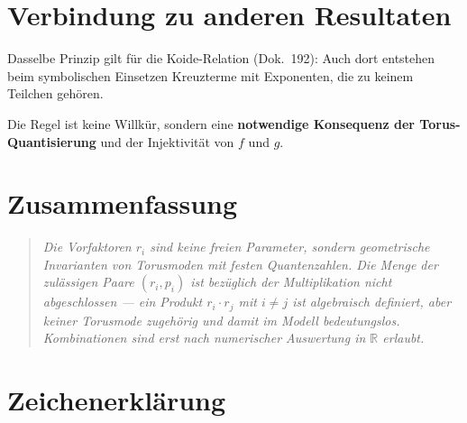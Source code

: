 \section{Verbindung zu anderen Resultaten}

Dasselbe Prinzip gilt für die Koide-Relation (Dok.~192):
Auch dort entstehen beim symbolischen Einsetzen Kreuzterme mit
Exponenten, die zu keinem Teilchen gehören.

Die Regel ist keine Willkür, sondern eine \textbf{notwendige
Konsequenz der Torus-Quantisierung} und der Injektivität von
$f$ und $g$.

\section*{Zusammenfassung}

\begin{quote}
\emph{Die Vorfaktoren $r_i$ sind keine freien Parameter, sondern
geometrische Invarianten von Torusmoden mit festen Quantenzahlen.
Die Menge der zulässigen Paare $(r_i, p_i)$ ist bezüglich der
Multiplikation nicht abgeschlossen --- ein Produkt $r_i \cdot r_j$
mit $i \neq j$ ist algebraisch definiert, aber keiner Torusmode zugehörig
und damit im Modell bedeutungslos. Kombinationen sind erst nach
numerischer Auswertung in $\mathbb{R}$ erlaubt.}
\end{quote}

\section*{Zeichenerklärung}

